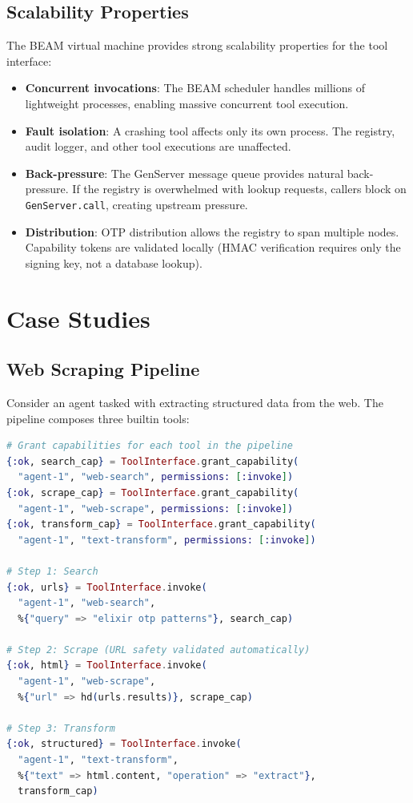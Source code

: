 \documentclass[12pt,a4paper]{article}
\theoremstyle{plain}
\theoremstyle{definition}
\begin{document}
\subsection{Scalability Properties}

The BEAM virtual machine provides strong scalability properties for the tool interface:

\begin{itemize}[leftmargin=2em]
\item \textbf{Concurrent invocations}: The BEAM scheduler handles millions of lightweight processes, enabling massive concurrent tool execution.
\item \textbf{Fault isolation}: A crashing tool affects only its own process. The registry, audit logger, and other tool executions are unaffected.
\item \textbf{Back-pressure}: The GenServer message queue provides natural back-pressure. If the registry is overwhelmed with lookup requests, callers block on \texttt{GenServer.call}, creating upstream pressure.
\item \textbf{Distribution}: OTP distribution allows the registry to span multiple nodes. Capability tokens are validated locally (HMAC verification requires only the signing key, not a database lookup).
\end{itemize}


\section{Case Studies}
\label{sec:case-studies}

\subsection{Web Scraping Pipeline}

Consider an agent tasked with extracting structured data from the web. The pipeline composes three builtin tools:

\begin{lstlisting}[language=elixir, caption={Web scraping pipeline composing three tools.}, label={lst:web-pipeline}]
# Grant capabilities for each tool in the pipeline
{:ok, search_cap} = ToolInterface.grant_capability(
  "agent-1", "web-search", permissions: [:invoke])
{:ok, scrape_cap} = ToolInterface.grant_capability(
  "agent-1", "web-scrape", permissions: [:invoke])
{:ok, transform_cap} = ToolInterface.grant_capability(
  "agent-1", "text-transform", permissions: [:invoke])

# Step 1: Search
{:ok, urls} = ToolInterface.invoke(
  "agent-1", "web-search",
  %{"query" => "elixir otp patterns"}, search_cap)

# Step 2: Scrape (URL safety validated automatically)
{:ok, html} = ToolInterface.invoke(
  "agent-1", "web-scrape",
  %{"url" => hd(urls.results)}, scrape_cap)

# Step 3: Transform
{:ok, structured} = ToolInterface.invoke(
  "agent-1", "text-transform",
  %{"text" => html.content, "operation" => "extract"},
  transform_cap)
\end{lstlisting}
\end{document}
